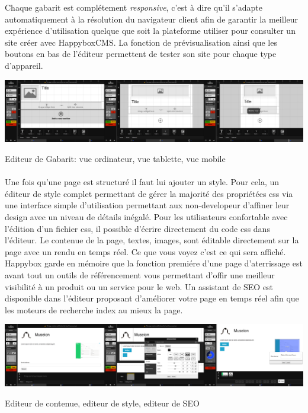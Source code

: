 \documentclass[11pt, a4paper ]{article}
\begin{document}
Chaque gabarit est complétement \emph{responsive}, c'est à dire qu'il s'adapte automatiquement à la résolution du navigateur client afin de garantir la meilleur expérience d'utilisation quelque que soit la plateforme utiliser pour consulter un site créer avec HappyboxCMS. La fonction de prévisualisation ainsi que les boutons en bas de l'éditeur permettent de tester son site pour chaque type d'appareil.


\begin{center}

		\includegraphics[width=\textwidth]{images/HBscreen/editeurGabarit.png}
		\caption{Editeur de Gabarit: vue ordinateur, vue tablette, vue mobile}

\end{center}

\paragraph{} %
Une fois qu'une page est structuré il faut lui ajouter un style. Pour cela, un éditeur de style complet permettant de gérer la majorité des propriétées css via une interface simple d'utilisation permettant aux non-developeur d'affiner leur design avec un niveau de détails inégalé. Pour les utilisateurs confortable avec l'édition d'un fichier css, il possible d'écrire directement du code css dans l'éditeur.
Le contenue de la page, textes, images, sont éditable directement sur la page avec un rendu en temps réel. Ce que vous voyez c'est ce qui sera affiché.
Happybox garde en mémoire que la fonction premiére d'une page d'aterrissage est avant tout un outils de référencement vous permettant d'offir une meilleur visibilité à un produit ou un service pour le web. Un assistant de SEO est disponible dans l'éditeur proposant d'améliorer votre page en temps réel afin que les moteurs de recherche index au mieux la page.
\begin{center}
	\includegraphics[width=\textwidth]{images/HBscreen/contenueStyleSeo.png}
	\caption{Editeur de contenue, editeur de style, editeur de SEO}
\end{center}
\end{document}
